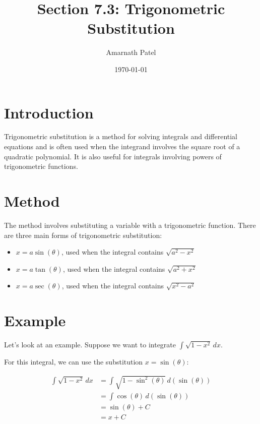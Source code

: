 \documentclass{article}
\begin{document}
\title{Section 7.3: Trigonometric Substitution}
\author{Amarnath Patel}
\date{\today}

\maketitle

\section{Introduction}

Trigonometric substitution is a method for solving integrals and differential equations and is often used when the integrand involves the square root of a quadratic polynomial. It is also useful for integrals involving powers of trigonometric functions.

\section{Method}

The method involves substituting a variable with a trigonometric function. There are three main forms of trigonometric substitution:

\begin{itemize}
    \item $x = a \sin(\theta)$, used when the integral contains $\sqrt{a^2 - x^2}$
    \item $x = a \tan(\theta)$, used when the integral contains $\sqrt{a^2 + x^2}$
    \item $x = a \sec(\theta)$, used when the integral contains $\sqrt{x^2 - a^2}$
\end{itemize}

\section{Example}

Let's look at an example. Suppose we want to integrate $\int \sqrt{1 - x^2} \, dx$.

For this integral, we can use the substitution $x = \sin(\theta)$:

\begin{align*}
    \int \sqrt{1 - x^2} \, dx &= \int \sqrt{1 - \sin^2(\theta)} \, d(\sin(\theta)) \\
    &= \int \cos(\theta) \, d(\sin(\theta)) \\
    &= \sin(\theta) + C \\
    &= x + C
\end{align*}
\end{document}
